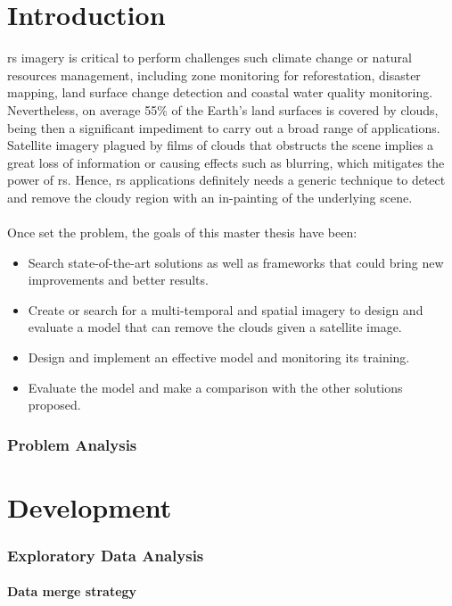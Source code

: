 \documentclass[11pt, a4paper]{article}
\begin{document}
	\part{Introduction} 
	\gls{rs} imagery is critical to perform challenges such climate change or natural resources management, including zone monitoring for reforestation, disaster mapping, land surface change detection and coastal water quality monitoring.  %
	Nevertheless, on average 55\% of the Earth's land surfaces is covered by clouds, being then a significant impediment to carry out a broad range of applications. Satellite imagery plagued by films of clouds that obstructs the scene implies a great loss of information or causing effects such as blurring, which mitigates the power of \gls{rs}. Hence, \gls{rs} applications definitely needs a generic technique to detect and remove the cloudy region with an in-painting of the underlying scene.
	\\
	\\
	Once set the problem, the goals of this master thesis have been:
	\begin{itemize}
		\item Search state-of-the-art solutions as well as frameworks that could bring new improvements and better results.
		\item Create or search for a multi-temporal and spatial imagery to design and evaluate a model that can remove the clouds given a satellite image.
		\item Design and implement an effective model and monitoring its training.
		\item Evaluate the model and make a comparison with the other solutions proposed.
	\end{itemize}

	\newpage
	\section{Problem Analysis}
	
	\newpage
	\part{Development}
	\section{Exploratory Data Analysis}
	
	\subsection{Data merge strategy}
	
	\newpage
\end{document}
